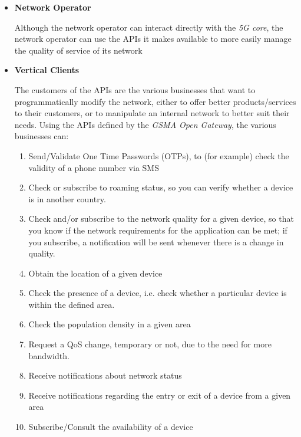 \begin{itemize}
  \item \textbf{Network Operator}

    Although the network operator can interact directly with the \emph{5G
    core}, the network operator can use the APIs it makes available to more
    easily manage the quality of service of its network

  \item{\textbf{Vertical Clients}}

    The customers of the APIs are the various businesses that want to
    programmatically modify the network, either to offer better
    products/services to their customers, or to manipulate an internal network
    to better suit their needs. Using the APIs defined by the \emph{GSMA Open
    Gateway}, the various businesses can:
    \begin{enumerate}
      \item Send/Validate One Time Passwords (OTPs), to (for example) check the
        validity of a phone number via SMS

      \item Check or subscribe to roaming status, so you can verify whether 
        a device is in another country.

      \item Check and/or subscribe to the network quality for a given device,
        so that you know if the network requirements for the application can be
        met; if you subscribe, a notification will be sent whenever there is a
        change in quality.

      \item Obtain the location of a given device

      \item Check the presence of a device, i.e. check whether a particular
        device is within the defined area.

      \item Check the population density in a given area

      \item Request a QoS change, temporary or not, due to the need for more
        bandwidth.

      \item Receive notifications about network status

      \item Receive notifications regarding the entry or exit of a device from
        a given area

      \item Subscribe/Consult the availability of a device
    \end{enumerate}
\end{itemize}

